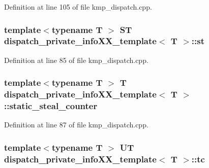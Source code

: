 Definition at line 105 of file kmp\-\_\-dispatch.\-cpp.

\hypertarget{structdispatch__private__infoXX__template_a962f937d3338dfb7e860eb7d451c6a1f}{
\subsubsection[{st}]{\setlength{\rightskip}{0pt plus 5cm}template$<$typename T $>$ {\bf S\-T} {\bf dispatch\-\_\-private\-\_\-info\-X\-X\-\_\-template}$<$ T $>$\-::st}}\label{structdispatch__private__infoXX__template_a962f937d3338dfb7e860eb7d451c6a1f}


Definition at line 85 of file kmp\-\_\-dispatch.\-cpp.

\hypertarget{structdispatch__private__infoXX__template_a96f4be72188c2f8386b83605fbdfa82c}{
\subsubsection[{static\-\_\-steal\-\_\-counter}]{\setlength{\rightskip}{0pt plus 5cm}template$<$typename T $>$ T {\bf dispatch\-\_\-private\-\_\-info\-X\-X\-\_\-template}$<$ T $>$\-::static\-\_\-steal\-\_\-counter}}\label{structdispatch__private__infoXX__template_a96f4be72188c2f8386b83605fbdfa82c}


Definition at line 87 of file kmp\-\_\-dispatch.\-cpp.

\hypertarget{structdispatch__private__infoXX__template_a8cda3453861f128894b5f26df19e401f}{
\subsubsection[{tc}]{\setlength{\rightskip}{0pt plus 5cm}template$<$typename T $>$ {\bf U\-T} {\bf dispatch\-\_\-private\-\_\-info\-X\-X\-\_\-template}$<$ T $>$\-::tc}}\label{structdispatch__private__infoXX__template_a8cda3453861f128894b5f26df19e401f}


